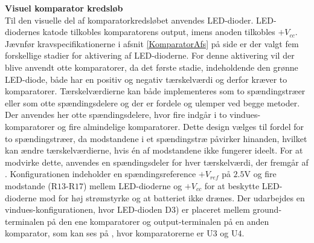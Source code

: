 \noindent\textbf{Visuel komparator kredsløb} \\
Til den visuelle del af komparatorkredsløbet anvendes LED-dioder. LED-diodernes katode tilkobles komparatorens output, imens anoden tilkobles $+V_{cc}$. Jævnfør kravspecifikationerne i afsnit \ref{KomparatorAfs} på side \pageref{KomparatorAfs} er der valgt fem forskellige stadier for aktivering af LED-dioderne. For denne aktivering vil der blive anvendt otte komparatorer, da det første stadie, indeholdende den grønne LED-diode, både har en positiv og negativ tærskelværdi og derfor kræver to komparatorer. Tærskelværdierne kan både implementeres som to spændingstræer eller som otte spændingsdelere og der er fordele og ulemper ved begge metoder. Der anvendes her otte spændingsdelere, hvor fire indgår i to vindues-komparatorer og fire almindelige komparatorer. Dette design vælges til fordel for to spændingstræer, da modstandene i et spændingstræ påvirker hinanden, hvilket kan ændre tærskelværdierne, hvis én af modstandene ikke fungerer ideelt. For at modvirke dette, anvendes en spændingsdeler for hver tærskelværdi, der fremgår af . Konfigurationen indeholder en spændingsreference $+V_{ref}$ på $2.5$V og fire modstande (R$13$-R$17$) mellem LED-dioderne og $+V_{cc}$ for at beskytte LED-dioderne mod for høj strømstyrke og at batteriet ikke drænes. Der udarbejdes en vindues-konfigurationen, hvor LED-dioden D$3$) er placeret mellem ground-terminalen på den ene komparatorer og output-terminalen på en anden komparator, som kan ses på , hvor komparatorerne er U$3$ og U$4$. 
